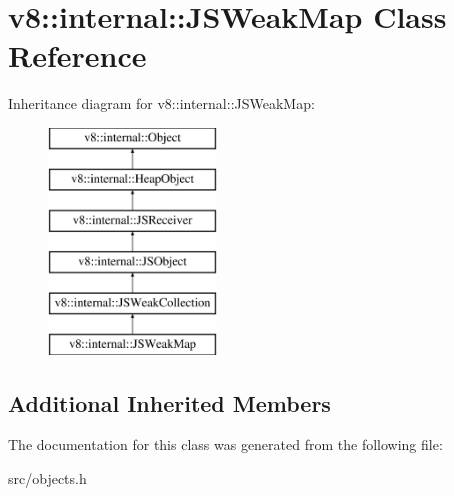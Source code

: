 \hypertarget{classv8_1_1internal_1_1_j_s_weak_map}{}\section{v8\+:\+:internal\+:\+:J\+S\+Weak\+Map Class Reference}
\label{classv8_1_1internal_1_1_j_s_weak_map}
Inheritance diagram for v8\+:\+:internal\+:\+:J\+S\+Weak\+Map\+:\begin{figure}[H]
\begin{center}
\leavevmode
\includegraphics[height=6.000000cm]{classv8_1_1internal_1_1_j_s_weak_map}
\end{center}
\end{figure}
\subsection*{Additional Inherited Members}


The documentation for this class was generated from the following file\+:\begin{DoxyCompactItemize}
\item 
src/objects.\+h\end{DoxyCompactItemize}
